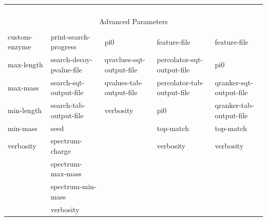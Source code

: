 \documentclass{article}
\begin{document}
\begin{table}[b]
\begin{tabular}{lllll}
                     &                                  &                                 &                                 &                                 \\
                     &                                  &                                 &                                 &                                 \\
                     &                                  &                                 &                                 &                                 \\
                     &                                  &                                 &                                 &                                 \\
\hline
\multicolumn{5}{c}{Advanced Parameters} \\
\hline \\
custom-enzyme        &print-search-progress             &pi0                              &feature-file                     &feature-file                     \\
max-length           &search-decoy-pvalue-file          &qvavlues-sqt-output-file         &percolator-sqt-output-file       &pi0                              \\
max-mass             &search-sqt-output-file            &qvalues-tab-output-file          &percolator-tab-output-file       &qranker-sqt-output-file          \\
min-length           &search-tab-output-file            &verbosity                        &pi0                              &qranker-tab-output-file          \\
min-mass             &seed                              &                                 &top-match                        &top-match                        \\
verbosity            &spectrum-charge                   &                                 &verbosity                        &verbosity                        \\
                     &spectrum-max-mass                 &                                 &                                 &                                 \\
                     &spectrum-min-mass                 &                                 &                                 &                                 \\
                     &verbosity                         &                                 &                                 &                                 \\

\end{tabular}
\end{table}
\end{document}

